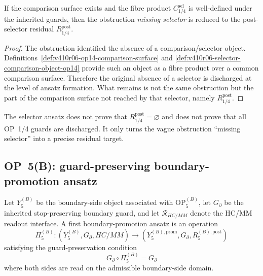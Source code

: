 \begin{lemma}
\label{lem:v410r06-selector-ansatz-reduces-op14-obstruction}
If the comparison surface exists and the fibre product
\(C_{1/4}^{\mathrm{sel}}\) is well-defined under the inherited guards, then the
obstruction \emph{missing selector} is reduced to the post-selector
residual \(R_{1/4}^{\mathrm{post}}\).
\end{lemma}

\begin{proof}
The obstruction identified the absence of a comparison/selector object.
Definitions~\ref{def:v410r06-op14-comparison-surface} and
\ref{def:v410r06-selector-comparison-object-op14} provide such an object as a
fibre product over a common comparison surface. Therefore the original absence
of a selector is discharged at the level of ansatz formation. What remains is
not the same obstruction but the part of the comparison surface not reached by
that selector, namely \(R_{1/4}^{\mathrm{post}}\).
\end{proof}

\begin{remark}
\label{rem:v410r06-selector-not-op14-closure}
The selector ansatz does not prove that \(R_{1/4}^{\mathrm{post}}=\varnothing\)
and does not prove that all OP~1/4 guards are discharged. It only turns the
vague obstruction ``missing selector'' into a precise residual target.
\end{remark}

\subsection{OP~5(B): guard-preserving boundary-promotion ansatz}
\label{subsec:v410r06-op5b-boundary-promotion-ansatz}

\begin{definition}
\label{def:v410r06-boundary-promotion-ansatz-op5b}
Let \(Y_{5}^{(B)}\) be the boundary-side object associated with
\(\mathrm{OP}_{5}^{(B)}\), let \(G_{\partial}\) be the inherited
stop-preserving boundary guard, and let \(\mathcal R_{HC/MM}\) denote the
HC/MM readout interface. A first boundary-promotion ansatz is an operation
\[
 \Pi_{5}^{(B)}:
 (Y_{5}^{(B)},G_{\partial},HC/MM)
 \longrightarrow
 (Y_{5}^{(B),\mathrm{prom}},G_{\partial},R_{5}^{(B),\mathrm{post}})
\]
satisfying the guard-preservation condition
\[
 G_{\partial}\circ \Pi_{5}^{(B)}=G_{\partial}
\]
where both sides are read on the admissible boundary-side domain.
\end{definition}

